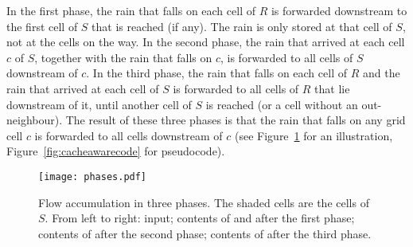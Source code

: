 \documentclass[10pt,a4paper]{article}
\begin{document}
In the first phase, the rain that falls on each cell of $R$ is forwarded downstream to the first cell of $S$ that is reached (if any). The rain is only stored at that cell of $S$, not at the cells on the way. In the second phase, the rain that arrived at each cell $c$ of $S$, together with the rain that falls on $c$, is forwarded to all cells of $S$ downstream of $c$. In the third phase, the rain that falls on each cell of $R$ and the rain that arrived at each cell of $S$ is forwarded to all cells of $R$ that lie downstream of it, until another cell of $S$ is reached (or a cell without an out-neighbour). The result of these three phases is that the rain that falls on any grid cell $c$ is forwarded to all cells downstream of $c$ (see Figure~\ref{fig:cacheawarephases} for an illustration, Figure~\ref{fig:cacheawarecode} for pseudocode).

\begin{figure}
\centering
\texttt{[image: phases.pdf]}
\caption{Flow accumulation in three phases. The shaded cells are the cells of $S$. From left to right: input; contents of  and  after the first phase; contents of  after the second phase; contents of  after the third phase.}
\label{fig:cacheawarephases}
\end{figure}
\end{document}
